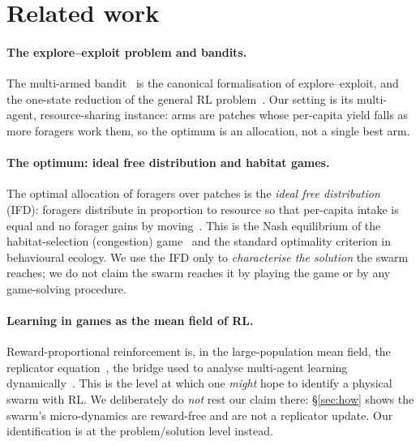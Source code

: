 \documentclass{article}
\begin{document}
\section{Related work}
\label{sec:related}
\paragraph{The explore--exploit problem and bandits.} The multi-armed bandit~\citep{robbins1952bandit,
lattimore2020bandit} is the canonical formalisation of explore--exploit, and the one-state reduction of the
general RL problem~\citep{SuttonBarto2018}. Our setting is its multi-agent, resource-sharing instance: arms are
patches whose per-capita yield falls as more foragers work them, so the optimum is an allocation, not a single
best arm.

\paragraph{The optimum: ideal free distribution and habitat games.} The optimal allocation of foragers over
patches is the \emph{ideal free distribution} (IFD): foragers distribute in proportion to resource so that
per-capita intake is equal and no forager gains by moving~\citep{fretwell1969ideal}. This is the Nash
equilibrium of the habitat-selection (congestion) game~\citep{rosenthal1973congestion,wardrop1952road} and the
standard optimality criterion in behavioural ecology. We use the IFD only to \emph{characterise the solution}
the swarm reaches; we do not claim the swarm reaches it by playing the game or by any game-solving procedure.

\paragraph{Learning in games as the mean field of RL.} Reward-proportional reinforcement is, in the
large-population mean field, the replicator equation~\citep{borgers1997learning}, the bridge used to analyse
multi-agent learning dynamically~\citep{hofbauer1998evolutionary,sandholm2010population,tuyls2005evolutionary,
bloembergen2015evolutionary}. This is the level at which one \emph{might} hope to identify a physical swarm
with RL. We deliberately do \emph{not} rest our claim there: \S\ref{sec:how} shows the swarm's micro-dynamics
are reward-free and are not a replicator update. Our identification is at the problem/solution level instead.
\end{document}
